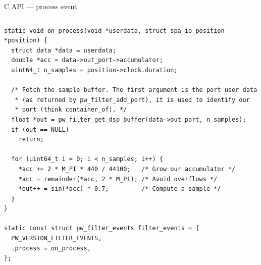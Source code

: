 \begin{frame}[fragile]{C API —  process event}
  \begin{columns}
      \begin{block}{}
        \fontsize{8}{8}\selectfont
          \begin{verbatim}
static void on_process(void *userdata, struct spa_io_position *position) {
  struct data *data = userdata;
  double *acc = data->out_port->accumulator;
  uint64_t n_samples = position->clock.duration;

  /* Fetch the sample buffer. The first argument is the port user data
   * (as returned by pw_filter_add_port), it is used to identify our
   * port (think container_of). */
  float *out = pw_filter_get_dsp_buffer(data->out_port, n_samples);
  if (out == NULL)
    return;

  for (uint64_t i = 0; i < n_samples; i++) {
    *acc += 2 * M_PI * 440 / 44100;   /* Grow our accumulator */
    *acc = remainder(*acc, 2 * M_PI); /* Avoid overflows */
    *out++ = sin(*acc) * 0.7;         /* Compute a sample */
  }
}

static const struct pw_filter_events filter_events = {
  PW_VERSION_FILTER_EVENTS,
  .process = on_process,
};
          \end{verbatim}
        \end{block}
  \end{columns}
\end{frame}



